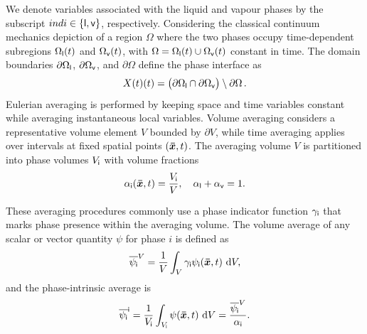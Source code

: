 We denote variables associated with the liquid and vapour phases by the subscript
 \(ind{i} \in \{\mathsf {l}, \mathsf {v}\}\), respectively. Considering the classical continuum mechanics 
 depiction of a region \(\Omega\) where the
  two phases occupy time-dependent subregions \(\Omega_{\mathsf {l}}(t)\) and \(\Omega_{\mathsf {v}}(t)\), 
  with \(\Omega = \Omega_{\mathsf {l}}(t) \cup \Omega_{\mathsf {v}}(t)\) constant in time. The 
  domain boundaries \(\partial \Omega_{\mathsf {l}}\), \(\partial \Omega_{\mathsf {v}}\), and \(\partial \Omega\) 
  define the phase interface as
\begin{equation}
  X(t)(t) = \bigl(\partial \Omega_{\mathsf {l}} \cap \partial \Omega_{\mathsf {v}}\bigr) \setminus \partial \Omega\,.
\end{equation} %
Eulerian averaging is performed by keeping space and time variables constant while averaging 
 instantaneous local variables. Volume averaging considers a representative volume 
 element \(V\) bounded by \(\partial V\), while time averaging applies over intervals at fixed
 spatial points \((\bm{\bar{x}}, t)\). The averaging volume \(V\) is partitioned into 
 phase volumes \(V_{\mathsf {i}}\) with volume fractions
\begin{equation}
  \alpha_{\mathsf {i}}(\bm{\bar{x}}, t) = \frac{V_{\mathsf {i}}}{V}, \quad \alpha_{\mathsf {l}} + \alpha_{\mathsf {v}} = 1.
\end{equation} %

These averaging procedures commonly use a phase indicator 
function \(\gamma_{\mathsf {i}}\) that marks phase presence within the averaging 
volume. The volume average of any scalar or vector quantity \(\psi\) for 
phase \(i\) is defined as~\cite{ishiiThermoFluidDynamicsTwoPhase2011,prosperettiCOMPUTATIONALMETHODSMULTIPHASE}
\begin{equation}
  \overline{\psi_{\mathsf {i}}}^V = \frac{1}{V} \int_V \gamma_{\mathsf {i}} \psi_{\mathsf {i}}(\bm{\bar{x}}, t) \, \mathop{}\!\mathrm{d}{V},
\end{equation}
and the phase-intrinsic average is
\begin{equation}
  \overline{\psi_{\mathsf {i}}}^{\mathsf {i}} = \frac{1}{V_{\mathsf {i}}} \int_{V_{\mathsf {i}}} \psi(\bm{\bar{x}}, t) \, \mathop{}\!\mathrm{d}{V} = \frac{\overline{\psi_{\mathsf {i}}}^V}{\alpha_{\mathsf {i}}}.
\end{equation} %

